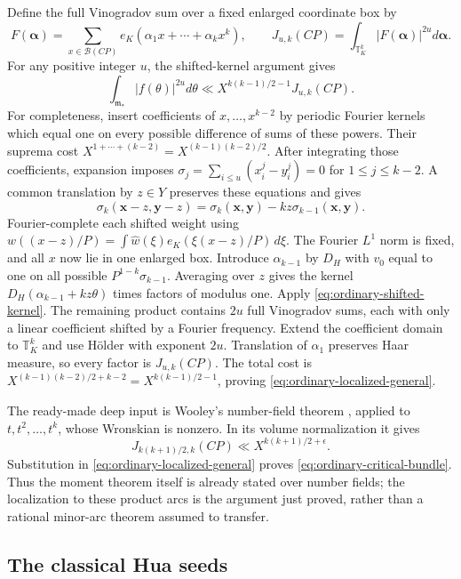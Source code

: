 \documentclass[11pt,reqno]{amsart}
\numberwithin{equation}{section}
\theoremstyle{definition}
\begin{document}
Define the full Vinogradov sum over a fixed enlarged coordinate box by
\[
 F(\boldsymbol\alpha)=\sum_{x\in\mathcal B(CP)}
    e_K(\alpha_1x+\cdots+\alpha_kx^k),\qquad
 J_{u,k}(CP)=\int_{\mathbb T_K^k}|F(\boldsymbol\alpha)|^{2u}
                 d\boldsymbol\alpha.
\]
For any positive integer $u$, the shifted-kernel argument gives
\begin{equation}\label{eq:ordinary-localized-general}
 \int_{\mathfrak m_*}|f(\theta)|^{2u}d\theta
       \ll X^{k(k-1)/2-1}J_{u,k}(CP).
\end{equation}
For completeness, insert coefficients of $x,\ldots,x^{k-2}$ by periodic
Fourier kernels which equal one on every possible difference of sums of these
powers.  Their suprema cost
$X^{1+\cdots+(k-2)}=X^{(k-1)(k-2)/2}$.
After integrating those coefficients, expansion imposes
$\sigma_j=\sum_{i\le u}(x_i^j-y_i^j)=0$ for $1\le j\le k-2$.
A common translation by $z\in Y$ preserves these equations and gives
\[
 \sigma_k(\mathbf x-z,\mathbf y-z)
      =\sigma_k(\mathbf x,\mathbf y)-kz\sigma_{k-1}(\mathbf x,\mathbf y).
\]
Fourier-complete each shifted weight using
$w((x-z)/P)=\int\widehat w(\xi)e_K(\xi(x-z)/P)\,d\xi$.
The Fourier $L^1$ norm is fixed, and all $x$ now lie in one enlarged box.
Introduce $\alpha_{k-1}$ by $D_H$ with $v_0$ equal to one on all possible
$P^{1-k}\sigma_{k-1}$.
Averaging over $z$ gives the kernel
$D_H(\alpha_{k-1}+kz\theta)$ times factors of modulus one.
Apply \eqref{eq:ordinary-shifted-kernel}.
The remaining product contains $2u$ full Vinogradov sums, each with only a
linear coefficient shifted by a Fourier frequency.
Extend the coefficient domain to $\mathbb T_K^k$ and use H\"older with
exponent $2u$.  Translation of $\alpha_1$ preserves Haar measure, so every
factor is $J_{u,k}(CP)$.
The total cost is
$X^{(k-1)(k-2)/2+k-2}=X^{k(k-1)/2-1}$, proving
\eqref{eq:ordinary-localized-general}.

The ready-made deep input is Wooley's number-field theorem
\cite[Theorem~15.1]{Wooley2019}, applied to $t,t^2,\ldots,t^k$,
whose Wronskian is nonzero.  In its volume normalization it gives
\[
 J_{k(k+1)/2,k}(CP)\ll X^{k(k+1)/2+\epsilon}.
\]
Substitution in \eqref{eq:ordinary-localized-general} proves
\eqref{eq:ordinary-critical-bundle}.  Thus the moment theorem itself is
already stated over number fields; the localization to these product arcs is
the argument just proved, rather than a rational minor-arc theorem assumed to transfer.

\subsection{The classical Hua seeds}
\end{document}
